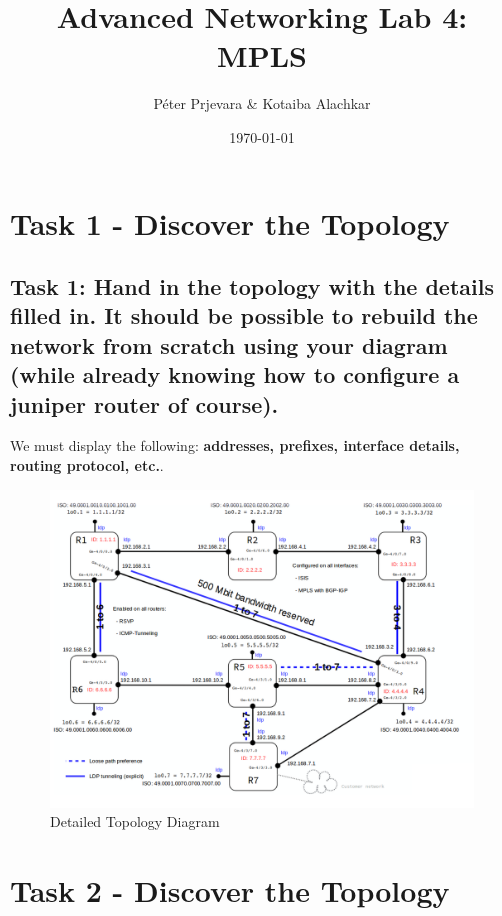 \documentclass[a4paper]{article}
\title{Advanced Networking Lab 4: MPLS}
\author{Péter Prjevara \& Kotaiba Alachkar}
\date{\today}
\begin{document}
\maketitle


\section{Task 1 - Discover the Topology}
\label{sec:task1}


\subsection{Task 1: Hand in the topology with the details filled in. It should be possible to rebuild the network from scratch using your diagram (while already knowing how to configure a juniper router of course).}

We must display the following: \textbf{addresses, prefixes, interface details, routing protocol, etc.}.


\begin{figure}[h]
\centering
\includegraphics[width=1\textwidth]{topology.png}
\caption{\label{fig:topology_diagram}Detailed Topology Diagram}
\end{figure}





\section{Task 2 - Discover the Topology}
\label{sec:task2}
\end{document}
